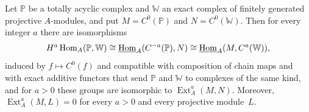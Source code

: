 \begin{lemma}
  \label{lemma:complete-resolutions}
  Let $\mathbb{P}$ be a totally acyclic complex and $\mathbb{W}$ an exact
  complex of finitely generated projective $A$-modules, and put
  ${M=C^0(\mathbb{P})}$ and ${N=C^0(\mathbb{W})}$. Then for every integer $a$
  there are isomorphisms
  \[
    H^a\Hom[A]{\mathbb{P}}{\mathbb{W}}\cong
    \underline{\operatorname{Hom}}_A(C^{-a}(\mathbb{P}),N)\cong
    \underline{\operatorname{Hom}}_A(M,C^a(\mathbb{W})),
  \]
  induced by ${f\mapsto C^0(f)}$ and compatible with composition of chain maps
  and with exact additive functors that send $\mathbb{P}$ and $\mathbb{W}$ to
  complexes of the same kind, and for ${a>0}$ these groups are isomorphic to
  $\operatorname{Ext}^a_A(M,N)$. Moreover, ${\operatorname{Ext}^a_A(M,L)=0}$ for
  every ${a>0}$ and every projective module~$L$.
\end{lemma}


